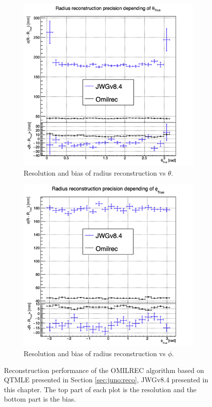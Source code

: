 \documentclass[../main.tex]{subfiles}
\begin{document}
\begin{figure}
  \begin{subfigure}[t]{0.48\linewidth}
    \centering
    \includegraphics[width=\linewidth]{images/jgnn/MSBvTT_nox.png}
    \caption{Resolution and bias of radius reconstruction vs $\theta$.}
    \label{fig:jgnn:MSBvTTC_nox}
  \end{subfigure}
  \begin{subfigure}[t]{0.48\linewidth}
    \centering
    \includegraphics[width=\linewidth]{images/jgnn/MSBvPT_nox.png}
    \caption{Resolution and bias of radius reconstruction vs $\phi$.}
    \label{fig:jgnn:MSBvPTC_nox}
  \end{subfigure}
  \caption{Reconstruction performance of the OMILREC algorithm based on QTMLE presented in Section \ref{sec:juno:reco}, JWGv8.4 presented in this chapter. The top part of each plot is the resolution and the bottom part is the bias.}
  \label{fig:jgnn:results_nox_3}
\end{figure}
\end{document}
